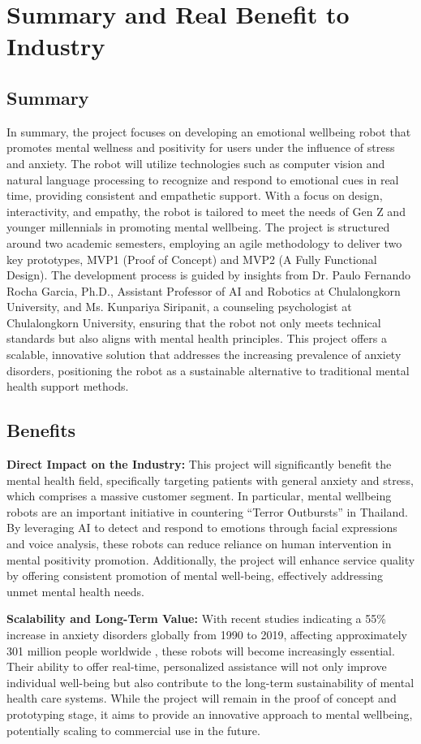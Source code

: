 \section{Summary and Real Benefit to Industry}

\subsection{Summary}
In summary, the project focuses on developing an emotional wellbeing robot that promotes mental wellness and positivity for users under the influence of stress and anxiety. The robot will utilize technologies such as computer vision and natural language processing to recognize and respond to emotional cues in real time, providing consistent and empathetic support. With a focus on design, interactivity, and empathy, the robot is tailored to meet the needs of Gen Z and younger millennials in promoting mental wellbeing. The project is structured around two academic semesters, employing an agile methodology to deliver two key prototypes, MVP1 (Proof of Concept) and MVP2 (A Fully Functional Design).
The development process is guided by insights from Dr. Paulo Fernando Rocha Garcia, Ph.D., Assistant Professor of AI and Robotics at Chulalongkorn University, and Ms. Kunpariya Siripanit, a counseling psychologist at Chulalongkorn University, ensuring that the robot not only meets technical standards but also aligns with mental health principles. This project offers a scalable, innovative solution that addresses the increasing prevalence of anxiety disorders, positioning the robot as a sustainable alternative to traditional mental health support methods.

\subsection{Benefits}

\textbf{Direct Impact on the Industry:}  
This project will significantly benefit the mental health field, specifically targeting patients with general anxiety and stress, which comprises a massive customer segment. In particular, mental wellbeing robots are an important initiative in countering “Terror Outbursts” in Thailand. By leveraging AI to detect and respond to emotions through facial expressions and voice analysis, these robots can reduce reliance on human intervention in mental positivity promotion. Additionally, the project will enhance service quality by offering consistent promotion of mental well-being, effectively addressing unmet mental health needs.

\textbf{Scalability and Long-Term Value:}  
With recent studies indicating a 55\% increase in anxiety disorders globally from 1990 to 2019, affecting approximately 301 million people worldwide \cite{javaid2023}, these robots will become increasingly essential. Their ability to offer real-time, personalized assistance will not only improve individual well-being but also contribute to the long-term sustainability of mental health care systems. While the project will remain in the proof of concept and prototyping stage, it aims to provide an innovative approach to mental wellbeing, potentially scaling to commercial use in the future.